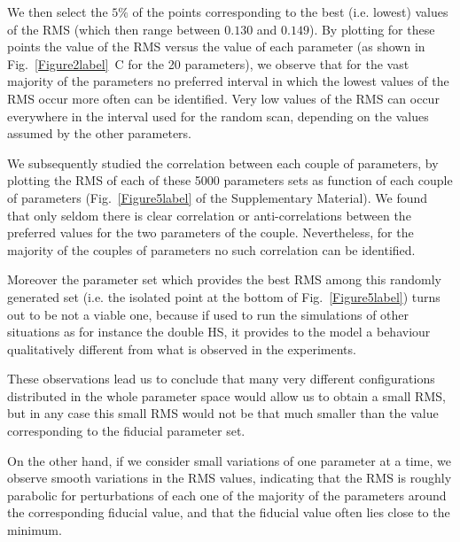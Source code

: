 \documentclass[oneside, 10pt, a4paper, twocolumn]{article}
\begin{document}
We then select the $5\%$ of the points corresponding to the best (i.e. lowest) values of the RMS (which then range between $0.130$ and $0.149$). 
By plotting for these points the value of the RMS versus the value of each parameter (as shown in Fig.~\ref{Figure2label}~C for the 20 parameters), we observe that for the vast majority of the parameters no preferred interval in which the lowest values of the RMS occur more often can be identified. Very low values of the RMS can occur everywhere in the interval used for the random scan, depending on the values assumed by the other parameters. 

We subsequently studied the correlation between each couple of parameters, by plotting the RMS of each of these 5000 parameters sets as function of each couple of parameters (Fig.~\ref{Figure5label} of the Supplementary Material). We found that only seldom there is clear correlation or anti-correlations between the preferred values for the two parameters of the couple. Nevertheless, for the majority of the couples of parameters no such correlation can be identified. 

Moreover the parameter set which provides the best RMS among this randomly generated set (i.e. the isolated point at the bottom of Fig.~\ref{Figure5label}) turns out to be not a viable one, because if used to run the simulations of other situations as for instance the double HS, it provides to the model a behaviour qualitatively different from what is observed in the experiments.

These observations lead us to conclude that many very different configurations distributed in the whole parameter space would allow us to obtain a small RMS, but in any case this small RMS would not be that much smaller than the value corresponding to the fiducial parameter set.

On the other hand, if we consider small variations of one parameter at a time, we observe smooth variations in the RMS values, indicating that the RMS is roughly parabolic for perturbations of each one of the majority of the parameters around the corresponding fiducial value, and that the fiducial value often lies close to the minimum.

\end{document}
